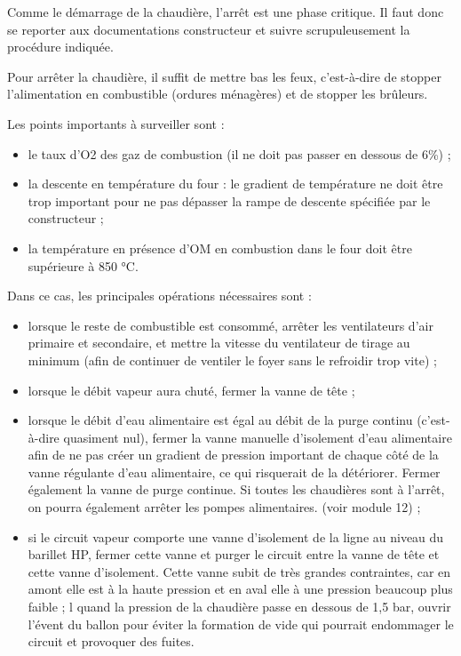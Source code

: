 Comme le démarrage de la chaudière, l’arrêt est une phase critique. Il faut donc se reporter aux documentations constructeur et suivre scrupuleusement la procédure indiquée. 
\vspace{0.3cm}

Pour arrêter la chaudière, il suffit de mettre bas les feux, c’est-à-dire de stopper l’alimentation en combustible (ordures ménagères) et de stopper les brûleurs.
\vspace{0.3cm}

Les points importants à surveiller sont :

 \begin{itemize}
\item  le taux d’O2 des gaz de combustion (il ne doit pas passer en dessous de 6\%) ;
\item  la descente en température du four : le gradient de température ne doit être trop important pour ne pas dépasser la rampe de descente spécifiée par le constructeur ;
\item  la température en présence d’OM en combustion dans le four doit être supérieure à 850 °C.

\end{itemize}



Dans ce cas, les principales opérations nécessaires sont :
 \begin{itemize}
\item  lorsque le reste de combustible est consommé, arrêter les ventilateurs d’air primaire et secondaire, et mettre la vitesse du ventilateur de tirage au minimum (afin de continuer de ventiler le foyer sans le refroidir trop vite) ;
\item  lorsque le débit vapeur aura chuté, fermer la vanne de tête ;
\item  lorsque le débit d’eau alimentaire est égal au débit de la purge continu (c’est-à-dire quasiment nul), fermer la vanne manuelle d’isolement d’eau alimentaire afin de ne pas créer un gradient de pression important de chaque côté de la vanne régulante d’eau alimentaire, ce qui risquerait de la détériorer. Fermer également la vanne de purge continue. Si toutes les chaudières sont à l’arrêt, on pourra également arrêter les pompes alimentaires. (voir module 12) ;
\item  si le circuit vapeur comporte une vanne d’isolement de la ligne au niveau du barillet HP, fermer cette vanne et purger le circuit entre la vanne de tête et cette vanne d’isolement. Cette vanne subit de très grandes contraintes, car en amont elle est à la haute pression et en aval elle à une pression beaucoup plus faible ;
l quand la pression de la chaudière passe en dessous de 1,5 bar, ouvrir l’évent du ballon pour éviter la formation de vide qui pourrait endommager le circuit et provoquer des fuites.

\end{itemize}


